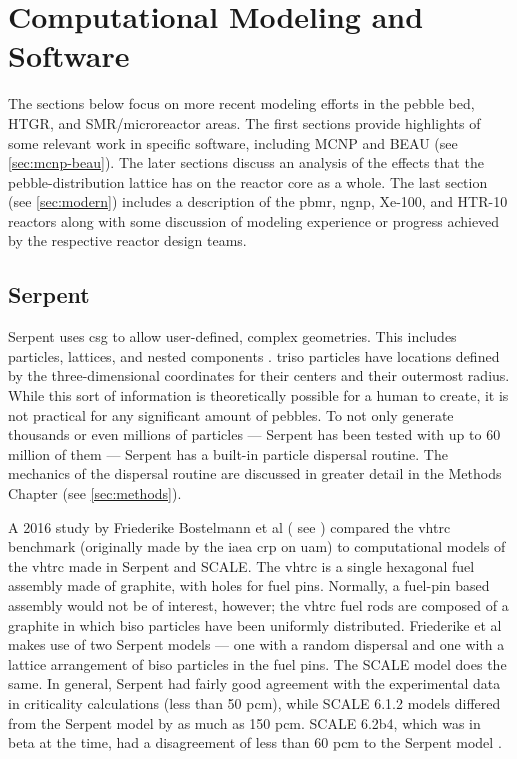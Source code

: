 
\section{Computational Modeling and Software}

The sections below focus on more recent modeling efforts in the pebble bed, HTGR, and SMR/microreactor areas.  The first sections provide highlights of some relevant work in specific software, including MCNP and BEAU \cite{cisneros_pebble_2013} (see \autoref{sec:mcnp-beau}).  The later sections discuss an analysis of the effects that the pebble-distribution lattice has on the reactor core as a whole.  The last section (see \autoref{sec:modern}) includes a description of the \acrfull{pbmr}, \acrfull{ngnp}, Xe-100, and HTR-10 reactors along with some discussion of modeling experience or progress achieved by the respective reactor design teams.

\subsection{Serpent}

Serpent uses \acrfull{csg} to allow user-defined, complex geometries.  This includes particles, lattices, and nested components \cite{noauthor_serpent_nodate}.  \acrshort{triso} particles have locations defined by the three-dimensional coordinates for their centers and their outermost radius.  While this sort of information is theoretically possible for a human to create, it is not practical for any significant amount of pebbles.  To not only generate thousands or even millions of particles --- Serpent has been tested with up to 60 million of them \cite{noauthor_serpent_nodate} --- Serpent has a built-in particle dispersal routine.  The mechanics of the dispersal routine are discussed in greater detail in the Methods Chapter (see \autoref{sec:methods}).

A 2016 study by Friederike Bostelmann et al ( see \cite{bostelmann_criticality_2016}) compared the \acrfull{vhtrc} benchmark (originally made by the \acrfull{iaea} \acrfull{crp} on \acrfull{uam}) to computational models of the \acrshort{vhtrc} made in Serpent and SCALE.  The \acrshort{vhtrc} is a single hexagonal fuel assembly made of graphite, with holes for fuel pins.  Normally, a fuel-pin based assembly would not be of interest, however; the \acrshort{vhtrc} fuel rods are composed of a graphite in which \acrshort{biso} particles have been uniformly distributed.  Friederike et al makes use of two Serpent models --- one with a random dispersal and one with a lattice arrangement of \acrshort{biso} particles in the fuel pins.  The SCALE model does the same.  In general, Serpent had fairly good agreement with the experimental data in criticality calculations (less than 50 pcm), while SCALE 6.1.2 models differed from the Serpent model by as much as 150 pcm.  SCALE 6.2b4, which was in beta at the time, had a disagreement of less than 60 pcm to the Serpent model \cite{bostelmann_criticality_2016}.

